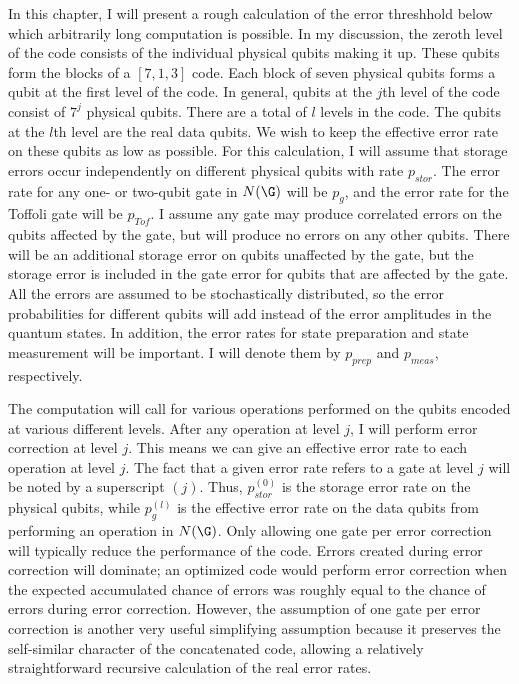 In this chapter, I will present a rough calculation of the error threshhold
below which arbitrarily long computation is possible.  In my discussion,
the zeroth level of the code consists of the individual physical qubits making
it up.  These qubits form the blocks of a $[7,1,3]$ code.  Each block of seven
physical qubits forms a qubit at the first level of the code.  In general,
qubits at the $j$th level of the code consist of $7^j$ physical qubits.  There
are a total of $l$ levels in the code.  The qubits at the $l$th level are the
real data qubits.  We wish to keep the effective error rate on these qubits as
low as possible.  For this calculation, I will assume that storage errors occur
independently on different physical qubits with rate $p_{stor}$.  The error
rate for any one- or two-qubit gate in $N(\G)$ will be $p_g$, and the error
rate for the Toffoli gate will be $p_{Tof}$.  I assume any gate may produce
correlated errors on the qubits affected by the gate, but will produce no
errors on any other qubits.  There will be an additional storage error on
qubits unaffected by the gate, but the storage error is included in the gate
error for qubits that are affected by the gate.  All the errors are assumed
to be stochastically distributed, so the error probabilities for different
qubits will add instead of the error amplitudes in the quantum states.  In
addition, the error rates for state preparation and state measurement will
be important.  I will denote them by $p_{prep}$ and $p_{meas}$,
respectively.

The computation will call for various operations performed on the qubits
encoded at various different levels.  After any operation at level $j$, I will
perform error correction at level $j$.  This means we can give an effective
error rate to each operation at level $j$.  The fact that a given error rate
refers to a gate at level $j$ will be noted by a superscript $(j)$.  Thus,
$p_{stor}^{(0)}$ is the storage error rate on the physical qubits, while
$p_{g}^{(l)}$ is the effective error rate on the data qubits from performing
an operation in $N(\G)$.  Only allowing one gate per error correction will
typically reduce the performance of the code.  Errors created during error
correction will dominate; an optimized code would perform error
correction when the expected accumulated chance of errors was roughly
equal to the chance of errors during error correction.  However, the
assumption of one gate per error correction is another very useful simplifying
assumption because it preserves the self-similar character of the
concatenated code, allowing a relatively straightforward recursive
calculation of the real error rates.

